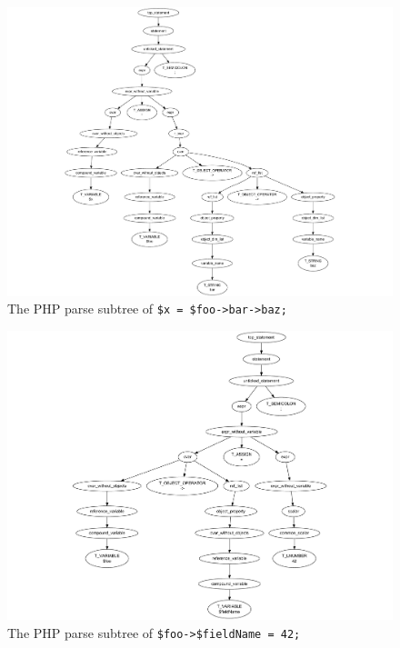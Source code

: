 \begin{figure}[htb]
  \begin{center}
    \includegraphics[scale=.74, trim=42mm 0mm 0mm 0mm]{images/multi-level-field-access-right}
    \caption{The PHP parse subtree of \texttt{\$x = \$foo->bar->baz;}}
    \label{fig:multi-level-field-access-right}
  \end{center}
\end{figure}

\begin{figure}[htb]
  \begin{center}
    \includegraphics[scale=.78, trim=46mm 0mm 0mm 0mm]{images/variable-field-access-left}
    \caption{The PHP parse subtree of \texttt{\$foo->\$fieldName = 42;}}
    \label{fig:variable-field-access-left}
  \end{center}
\end{figure}

